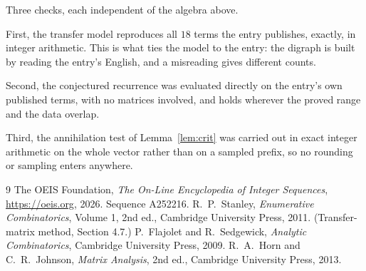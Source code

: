 \documentclass[11pt,a4paper]{article}
\theoremstyle{plain}
\theoremstyle{definition}
\begin{document}
Three checks, each independent of the algebra above.

First, the transfer model reproduces all $18$ terms the entry publishes, exactly, in
integer arithmetic. This is what ties the model to the entry: the digraph is built by reading
the entry's English, and a misreading gives different counts.

Second, the conjectured recurrence was evaluated directly on the entry's own published terms,
with no matrices involved, and holds wherever the proved range and the data overlap.

Third, the annihilation test of Lemma~\ref{lem:crit} was carried out in exact integer
arithmetic on the whole vector rather than on a sampled prefix, so no rounding or sampling
enters anywhere.

\begin{thebibliography}{9}
 The OEIS Foundation, \emph{The On-Line Encyclopedia of Integer
Sequences}, \url{https://oeis.org}, 2026. Sequence A252216.
 R.~P.~Stanley, \emph{Enumerative Combinatorics}, Volume 1, 2nd ed.,
Cambridge University Press, 2011. (Transfer-matrix method, Section 4.7.)
 P.~Flajolet and R.~Sedgewick, \emph{Analytic Combinatorics}, Cambridge
University Press, 2009.
 R.~A.~Horn and C.~R.~Johnson, \emph{Matrix Analysis}, 2nd ed., Cambridge
University Press, 2013.
\end{thebibliography}
\end{document}
